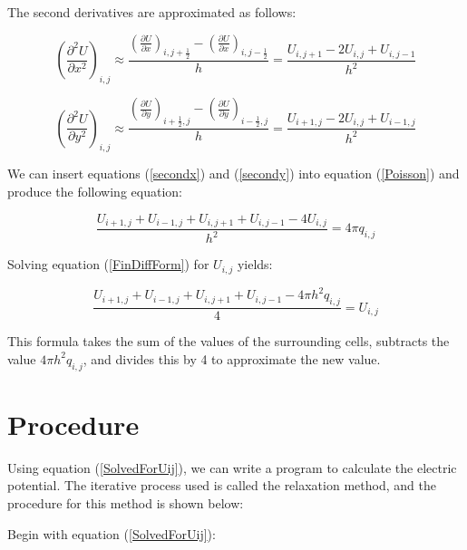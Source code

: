 \documentclass[12pt]{article}
\begin{document}
\vspace{34pt}

The second derivatives are approximated as follows:

\begin{equation}
  \left(\frac{\partial^2 U}{\partial x^2}\right)_{i,j} \approx \frac{\left(
  \frac{\partial U}{\partial x}\right)_{i,j+\frac{1}{2}} - \left(\frac{\partial
  U}{\partial x}\right)_{i,j-\frac{1}{2}}}{h} = \frac{U_{i,j+1}-2U_{i,j}+
  U_{i,j-1}}{h^2} \label{secondx}
\end{equation}

\begin{equation}
  \left(\frac{\partial^2 U}{\partial y^2}\right)_{i,j} \approx \frac{\left(
  \frac{\partial U}{\partial y}\right)_{i+\frac{1}{2},j} - \left(\frac{\partial
  U}{\partial y}\right)_{i-\frac{1}{2},j}}{h} = \frac{U_{i+1,j}-2U_{i,j}+
  U_{i-1,j}}{h^2} \label{secondy}
\end{equation}


We can insert equations (\ref{secondx}) and (\ref{secondy}) into equation
(\ref{Poisson}) and produce the following equation:

\begin{equation}
  \frac{U_{i+1,j} + U_{i-1,j} + U_{i,j+1} + U_{i,j-1} - 4U_{i,j}}{h^2}=4
  \pi q_{i,j} \label{FinDiffForm}
\end{equation}

Solving equation (\ref{FinDiffForm}) for $U_{i,j}$ yields:

\begin{equation}
  \frac{U_{i+1,j} + U_{i-1,j} + U_{i,j+1} + U_{i,j-1} - 4 \pi h^2 q_{i,j}}
  {4}=U_{i,j} \label{SolvedForUij}
\end{equation}

This formula takes the sum of the values of the surrounding cells, subtracts
the value $4\pi h^2 q_{i,j}$, and divides this by 4 to approximate the new value.

\section{Procedure}
Using equation (\ref{SolvedForUij}), we can write a program to calculate the
electric potential. The iterative process used is called the relaxation method,
and the procedure for this method is shown below:

Begin with equation (\ref{SolvedForUij}):
\end{document}
